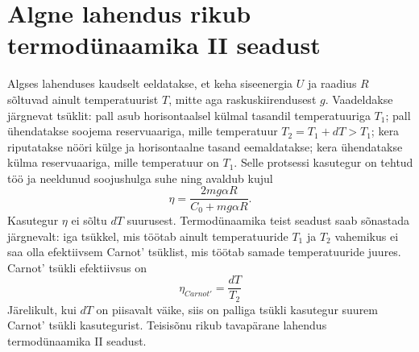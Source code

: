 \documentclass{trkut}%
\begin{document}
\section{Algne lahendus rikub termodünaamika II seadust} \label{rikub}

Algses lahenduses kaudselt eeldatakse, et keha siseenergia \(U\) ja raadius \(R\) sõltuvad ainult temperatuurist \(T\), mitte aga raskuskiirendusest \(g\).
Vaadeldakse järgnevat tsüklit: pall asub horisontaalsel külmal tasandil temperatuuriga \(T_1\); pall ühendatakse soojema reservuaariga, mille temperatuur \(T_2=T_1+dT>T_1\); kera riputatakse nööri külge ja horisontaalne tasand eemaldatakse; kera ühendatakse külma reservuaariga, mille temperatuur on \(T_1\).
Selle protsessi kasutegur on tehtud töö ja neeldunud soojushulga suhe ning avaldub kujul \parencite[3-5]{palma15}
\begin{equation}
    \eta = \frac{2mg\alpha R}{C_0+mg\alpha R}.
\end{equation}
Kasutegur \(\eta\) ei sõltu \(dT\) suurusest. Termodünaamika teist seadust saab sõnastada järgnevalt: iga tsükkel, mis töötab ainult temperatuuride \(T_1\) ja \(T_2\) vahemikus ei saa olla efektiivsem Carnot' tsüklist, mis töötab samade temperatuuride juures. Carnot' tsükli efektiivsus on \parencite[3-5]{palma15}
\begin{equation}
    \eta_{Carnot'} = \frac{dT}{T_2}
\end{equation}
Järelikult, kui \(dT\) on piisavalt väike, siis on palliga tsükli kasutegur suurem Carnot' tsükli kasutegurist. Teisisõnu rikub tavapärane lahendus termodünaamika II seadust.


%
\end{document}

